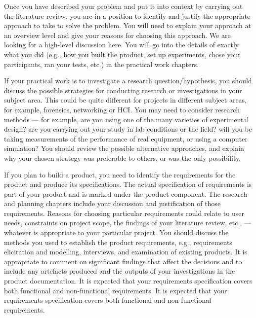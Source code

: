 {    Once you have described your problem and put it into context by carrying out the literature review, you are in a position to identify and justify the appropriate approach
    to take to solve the problem. You will need to explain your approach at an overview level and give your reasons for choosing this approach. We are looking for a
    high-level discussion here. You will go into the details of exactly what you did (e.g., how you built the product, set up experiments, chose your participants, ran your
    tests, etc.) in the practical work chapters.

    If your practical work is to investigate a research question/hypothesis, you should discuss the possible strategies for conducting research or
    investigations in your subject area. This could be quite different for projects in different subject areas, for example, forensics, networking or HCI. You may need to
    consider research methods --- for example, are you using one of the many varieties of experimental design? are you carrying out your study in lab conditions or the
    field? will you be taking measurements of the performance of real equipment, or using a computer simulation? You should review the possible alternative approaches, and
    explain why your chosen strategy was preferable to others, or was the only possibility.

    If you plan to build a product, you need to identify the requirements for the product and produce its specifications. The actual specification of requirements is part
    of your product and is marked under the product component. The research and planning chapters include your discussion and justification of those requirements. Reasons
    for choosing particular requirements could relate to user needs, constraints on project scope, the findings of your literature review, etc., --- whatever is appropriate
    to your particular project. You should discuss the methods you used to establish the product requirements, e.g., requirements elicitation and modelling, interviews,
    and examination of existing products. It is appropriate to comment on significant findings that affect the decisions and to include any artefacts produced and the outputs
    of your investigations in the product documentation. It is expected that your requirements specification covers both functional and non-functional requirements. It is
    expected that your requirements specification covers both functional and non-functional requirements.

}
